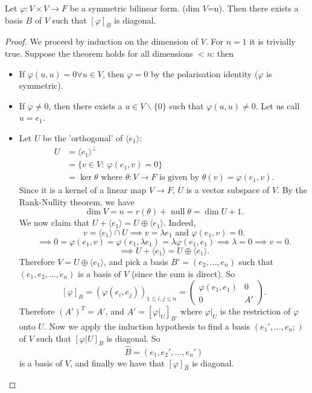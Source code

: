 \documentclass[egregdoesnotlikesansseriftitles,a4paper]{scrartcl}
\begin{document}
\begin{theorem}
     Let $\varphi: V \times V \rightarrow F$ be a symmetric bilinear form. (dim $V$=n). Then there exists a basis $B$ of $V$ such that $[\varphi]_B$ is diagonal.
\end{theorem}
\begin{proof}
     We proceed by induction on the dimension of $V$. For $n=1$ it is trivially true. Suppose the theorem holds for all dimensions $<n$: then
     \begin{itemize}
         \item If $\varphi (u,u)=0 \forall u \in V$, then $\varphi=0$ by the polarisation identity ($\varphi $ is symmetric).
         \item If $\varphi \neq 0$, then there exists a $u \in V \backslash \{0\}$ such that $\varphi (u,u) \neq 0$. Let us call $u=e_1$.
         \item Let $U$ be the 'orthogonal' of $\langle e_1 \rangle $: 
         \begin{equation*}
               \begin{split}
                    U&=\langle e_1 \rangle^\perp \\
                    &=\{v \in V: \ \varphi (e_1,v)=0\}\\
                    &=\operatorname{ker} \theta \text{ where } \theta:V \rightarrow F \text{ is given by } \theta (v)= \varphi (e_1,v).
               \end{split}
         \end{equation*}
         Since it is a kernel of a linear map $V \rightarrow F$, $U$ is a vector subspace of $V$. By the Rank-Nullity theorem, we have 
         \[\operatorname{dim} V=n= r(\theta)+ \operatorname{null}  \theta=\operatorname{dim}U+1.\]
         We now claim that $U+\langle e_1 \rangle =U \oplus \langle e_1 \rangle $. Indeed, 
         \[v= \langle e_1 \rangle  \cap U \implies v= \lambda e_1 \text{ and }  \varphi(e_1,v)=0 .\]
         \[\implies 0=\varphi (e_1,v)=\varphi (e_1, \lambda e_1)=\lambda \varphi (e_1,e_1) \implies \lambda=0 \implies v=0.\]
         \[\implies U+\langle e_1 \rangle =U \oplus \langle e_1 \rangle .\]
         Therefore $V=U \oplus \langle e_1 \rangle $, and pick a basis $B'=(e_2, \ldots ,e_n)$ such that $(e_1, e_2, \ldots , e_n)$ is a basis of $V$ (since the sum is direct). So 
         \[[\varphi]_B=(\varphi(e_i,e_j))_{1 \leq i,j \leq n}=\left(
          \begin{array}{c|c}
          \varphi (e_1,e_1) &0\\
            \hline
            0&A'
          \end{array}
          \right)
         .\]
         Therefore $(A')^T=A'$, and 
         $A'=[\varphi|_U]_{B'}$ where $\varphi|_U$ is the restriction of $\varphi$ onto $U$. Now we apply the induction hypothesis to find a basis $(e_1', \ldots ,e_n;)$ of $V$ such that $[\varphi|U]_{B}$ is diagonal. So 
         \[\hat{B}=(e_1,e_2',\ldots ,e_n')\] is a basis of $V$, and finally we have that $[\varphi]_{\hat{B}}$ is diagonal.      
     \end{itemize}
\end{proof}
\end{document}
